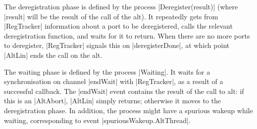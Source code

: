 The deregistration phase is defined by the process |Deregister(result)| (where
|result| will be the result of the call of the alt).  It repeatedly gets from
|RegTracker| information about a port to be deregistered, calls the relevant
deregistration function, and waits for it to return.  When there are no more
ports to deregister, |RegTracker| signals this on |deregisterDone|, at which
point |AltLin| ends the call on the alt. 

The waiting phase is defined by the process |Waiting|.  It waits for a
synchronisation on channel |endWait| with |RegTracker|, as a result of a
successful callback.  The |endWait| event contains the result of the call to
alt: if this is an |AltAbort|, |AltLin| simply returns; otherwise it moves to
the deregistration phase.  In addition, the process might have a spurious
wakeup while waiting, corresponding to event |spuriousWakeup.AltThread|. 


